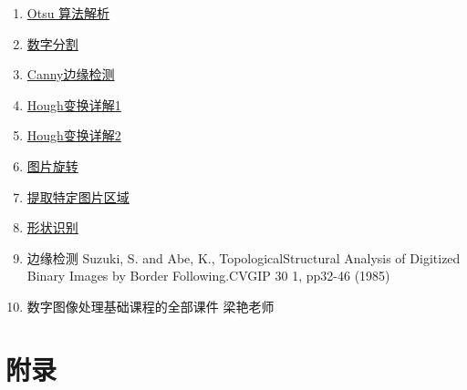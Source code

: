 \documentclass{ctexart}
\begin{document}
\begin{enumerate}
    \item \href{https://blog.csdn.net/a15779627836/article/details/124151125}{Otsu 算法解析}
    \item \href{https://www.cnblogs.com/skyfsm/p/8029668.html}{数字分割}
    \item \href{https://blog.csdn.net/weixin_42272768/article/details/111244896}{Canny边缘检测}
    \item \href{https://blog.csdn.net/qq_30460949/article/details/90293147}{Hough变换详解1}
    \item \href{https://blog.csdn.net/qq_41112170/article/details/125729100}{Hough变换详解2}
    \item \href{https://blog.csdn.net/wyx100/article/details/80541726}{图片旋转}
    \item \href{https://blog.csdn.net/weixin_47365088/article/details/116566822}{提取特定图片区域}
    \item \href{https://blog.csdn.net/LPYchengxuyuan/article/details/122003702?utm_medium=distribute.pc_relevant.none-task-blog-2~default~baidujs_baidulandingword~default-0-122003702-blog-124125975.pc_relevant_aa&spm=1001.2101.3001.4242.1&utm_relevant_index=3}{形状识别}
    \item 边缘检测 Suzuki, S. and Abe, K., TopologicalStructural Analysis of Digitized Binary Images by Border Following.CVGIP 30 1, pp32-46 (1985)
    \item 数字图像处理基础课程的全部课件 梁艳老师
\end{enumerate}

\section{附录}
\end{document}
